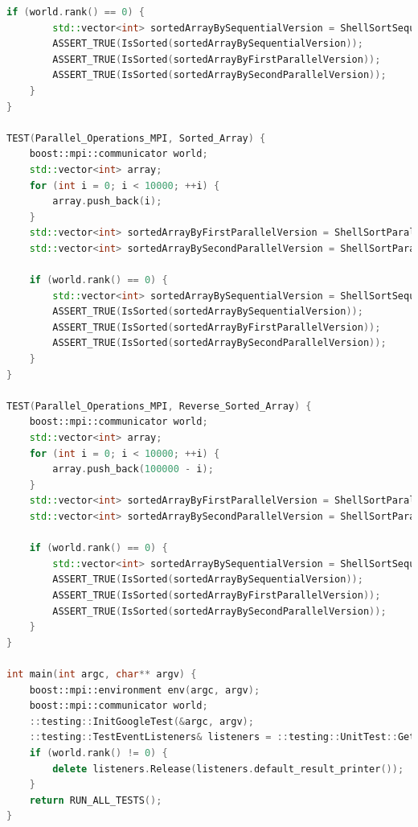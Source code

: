\documentclass{report}
\begin{document}
\begin{lstlisting}[language=C++,caption=main файл]
    if (world.rank() == 0) {
        std::vector<int> sortedArrayBySequentialVersion = ShellSortSequential(array);
        ASSERT_TRUE(IsSorted(sortedArrayBySequentialVersion));
        ASSERT_TRUE(IsSorted(sortedArrayByFirstParallelVersion));
        ASSERT_TRUE(IsSorted(sortedArrayBySecondParallelVersion));
    }
}

TEST(Parallel_Operations_MPI, Sorted_Array) {
    boost::mpi::communicator world;
    std::vector<int> array;
    for (int i = 0; i < 10000; ++i) {
        array.push_back(i);
    }
    std::vector<int> sortedArrayByFirstParallelVersion = ShellSortParallel(array);
    std::vector<int> sortedArrayBySecondParallelVersion = ShellSortParallel(array, true);

    if (world.rank() == 0) {
        std::vector<int> sortedArrayBySequentialVersion = ShellSortSequential(array);
        ASSERT_TRUE(IsSorted(sortedArrayBySequentialVersion));
        ASSERT_TRUE(IsSorted(sortedArrayByFirstParallelVersion));
        ASSERT_TRUE(IsSorted(sortedArrayBySecondParallelVersion));
    }
}

TEST(Parallel_Operations_MPI, Reverse_Sorted_Array) {
    boost::mpi::communicator world;
    std::vector<int> array;
    for (int i = 0; i < 10000; ++i) {
        array.push_back(100000 - i);
    }
    std::vector<int> sortedArrayByFirstParallelVersion = ShellSortParallel(array);
    std::vector<int> sortedArrayBySecondParallelVersion = ShellSortParallel(array, true);

    if (world.rank() == 0) {
        std::vector<int> sortedArrayBySequentialVersion = ShellSortSequential(array);
        ASSERT_TRUE(IsSorted(sortedArrayBySequentialVersion));
        ASSERT_TRUE(IsSorted(sortedArrayByFirstParallelVersion));
        ASSERT_TRUE(IsSorted(sortedArrayBySecondParallelVersion));
    }
}

int main(int argc, char** argv) {
    boost::mpi::environment env(argc, argv);
    boost::mpi::communicator world;
    ::testing::InitGoogleTest(&argc, argv);
    ::testing::TestEventListeners& listeners = ::testing::UnitTest::GetInstance()->listeners();
    if (world.rank() != 0) {
        delete listeners.Release(listeners.default_result_printer());
    }
    return RUN_ALL_TESTS();
}

\end{lstlisting}
\end{document}
